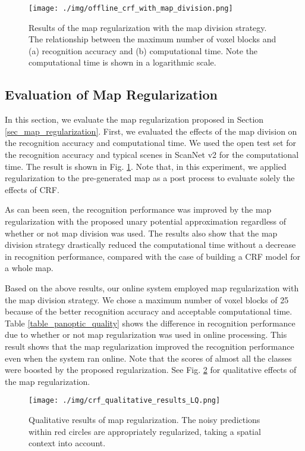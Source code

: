 \documentclass[letterpaper, 10pt, conference]{latex_template/ieeeconf}
\begin{document}
\begin{figure}[t]
   \centering
      \texttt{[image: ./img/offline\_crf\_with\_map\_division.png]}
      \caption{Results of the map regularization with the map division strategy. The relationship between the maximum number of voxel blocks and (a) recognition accuracy and (b) computational time. Note the computational time is shown in a logarithmic scale.}
      \label{fig_crf_with_map_division}
\end{figure}

\subsection{Evaluation of Map Regularization\label{sec_eval_crf}}
In this section, we evaluate the map regularization proposed in Section \ref{sec_map_regularization}.
First, we evaluated the effects of the map division on the recognition accuracy and computational time.
We used the open test set for the recognition accuracy and typical scenes in ScanNet v2 for the computational time.
The result is shown in Fig. \ref{fig_crf_with_map_division}.
Note that, in this experiment, we applied regularization to the pre-generated map as a post process to evaluate solely the effects of CRF.

As can been seen, the recognition performance was improved by the map regularization with the proposed unary potential approximation regardless of whether or not map division was used.
The results also show that the map division strategy drastically reduced the computational time without a decrease in recognition performance, compared with the case of building a CRF model for a whole map.

Based on the above results, our online system employed map regularization with the map division strategy.
We chose a maximum number of voxel blocks of 25 because of the better recognition accuracy and acceptable computational time.
Table \ref{table_panoptic_quality} shows the difference in recognition performance due to whether or not map regularization was used in online processing.
This result shows that the map regularization improved the recognition performance even when the system ran online.
Note that the scores of almost all the classes were boosted by the proposed regularization.
See Fig. \ref{fig_crf_qualitative_reuslts} for qualitative effects of the map regularization.

\begin{figure}[t]
   \centering
      \texttt{[image: ./img/crf\_qualitative\_results\_LQ.png]}
      \caption{Qualitative results of map regularization. The noisy predictions within red circles are appropriately regularized, taking a spatial context into account.}
      \label{fig_crf_qualitative_reuslts}
\end{figure}
\end{document}
